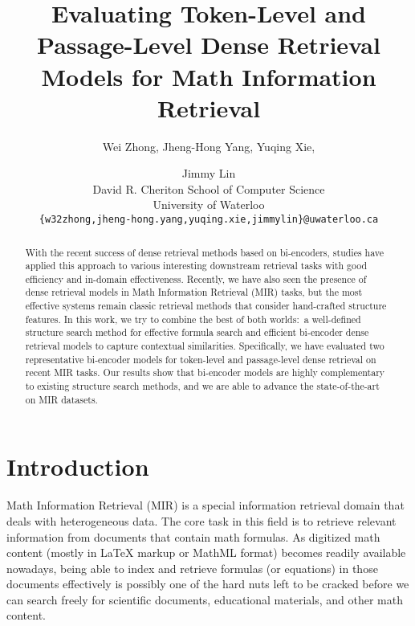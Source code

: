 \documentclass[11pt]{article}
\title{Evaluating Token-Level and Passage-Level Dense Retrieval Models for Math Information Retrieval}
\author{Wei Zhong, Jheng-Hong Yang, Yuqing Xie, \and Jimmy Lin \\[1ex]
  David R. Cheriton School of Computer Science\\
  University of Waterloo \\[1ex]
  \texttt{\{w32zhong,jheng-hong.yang,yuqing.xie,jimmylin\}@uwaterloo.ca}
}
\begin{document}
\maketitle
\begin{abstract}
With the recent success of dense retrieval methods based on bi-encoders, studies have applied this approach to various interesting downstream retrieval tasks with good efficiency and in-domain effectiveness.
Recently, we have also seen the presence of dense retrieval models in Math Information Retrieval (MIR) tasks,
but the most effective systems remain classic retrieval methods that consider hand-crafted structure features.
In this work, we try to combine the best of both worlds:\ a well-defined structure search method for effective formula search and efficient bi-encoder dense retrieval models to capture contextual similarities.
Specifically, we have evaluated two representative bi-encoder models for token-level and passage-level dense retrieval on recent MIR tasks.
Our results show that bi-encoder models are highly complementary to existing structure search methods, and we are able to advance the state-of-the-art on MIR datasets.
\end{abstract}

\section{Introduction}

Math Information Retrieval (MIR) is a special information retrieval domain that deals with heterogeneous data.
The core task in this field is to retrieve relevant information from documents that contain math formulas.
As digitized math content (mostly in \LaTeX{} markup or MathML format) becomes readily available nowadays,
being able to index and retrieve formulas (or equations) in those documents effectively is possibly one of the hard nuts left to be cracked before we can search freely for scientific documents, educational materials, and other math content.
\end{document}
